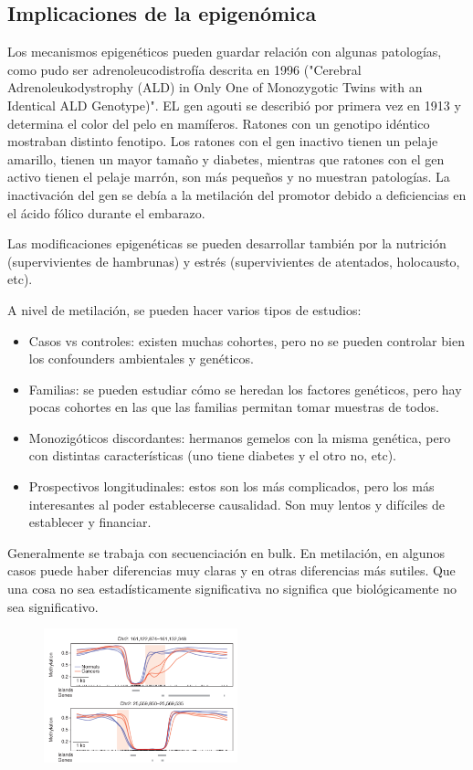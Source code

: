 \subsection{Implicaciones de la epigenómica}
Los mecanismos epigenéticos pueden guardar relación con algunas patologías, como pudo ser adrenoleucodistrofía descrita en 1996 ("Cerebral Adrenoleukodystrophy (ALD) in Only One of Monozygotic Twins with an Identical ALD Genotype)". EL gen agouti se describió por primera vez en 1913 y determina el color del pelo en mamíferos. Ratones con un genotipo idéntico mostraban distinto fenotipo. Los ratones con el gen inactivo tienen un pelaje amarillo, tienen un mayor tamaño y diabetes, mientras que ratones con el gen activo tienen el pelaje marrón, son más pequeños y no muestran patologías. La inactivación del gen se debía a la metilación del promotor debido a deficiencias en el ácido fólico durante el embarazo.

Las modificaciones epigenéticas se pueden desarrollar también por la nutrición (supervivientes de hambrunas) y estrés (supervivientes de atentados, holocausto, etc). 

A nivel de metilación, se pueden hacer varios tipos de estudios:
\begin{itemize}
\item Casos vs controles: existen muchas cohortes, pero no se pueden controlar bien los confounders ambientales y genéticos.
\item Familias: se pueden estudiar cómo se heredan los factores genéticos, pero hay pocas cohortes en las que las familias permitan tomar muestras de todos.
\item Monozigóticos discordantes: hermanos gemelos con la misma genética, pero con distintas características (uno tiene diabetes y el otro no, etc). 
\item Prospectivos longitudinales: estos son los más complicados, pero los más interesantes al poder establecerse causalidad. Son muy lentos y difíciles de establecer y financiar. 
\end{itemize}

Generalmente se trabaja con secuenciación en bulk. En metilación, en algunos casos puede haber diferencias muy claras y en otras diferencias más sutiles. Que una cosa no sea estadísticamente significativa no significa que biológicamente no sea significativo. 

\begin{figure}[h]
\centering
\includegraphics[width = 0.5\textwidth]{figs/met.png}
\end{figure}

